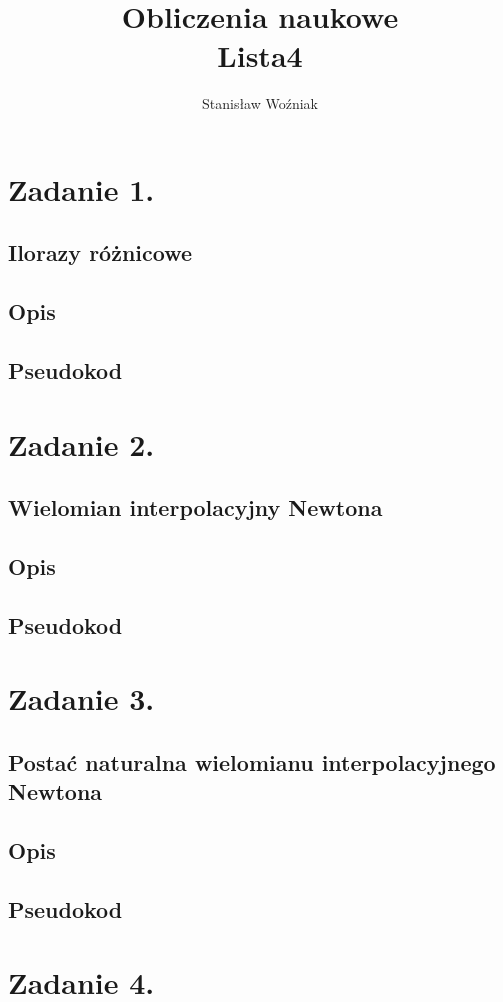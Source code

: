 \documentclass[11pt, a4paper]{article}
\title{Obliczenia naukowe\\Lista4}
\author{Stanisław Woźniak}
\date{}
\begin{document}
    \maketitle
    \section{Zadanie 1.}
    \subsection{Ilorazy różnicowe}
    \subsection{Opis}
    \subsection{Pseudokod}
    \section{Zadanie 2.}
    \subsection{Wielomian interpolacyjny Newtona}
    \subsection{Opis}
    \subsection{Pseudokod}
    \section{Zadanie 3.}
    \subsection{Postać naturalna wielomianu interpolacyjnego Newtona}
    \subsection{Opis}
    \subsection{Pseudokod}
    \section{Zadanie 4.}
\end{document}
